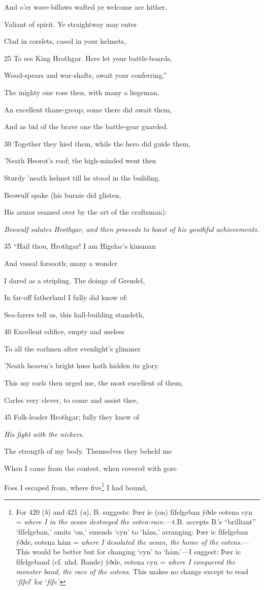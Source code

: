 And o’er wave-billows wafted ye welcome are hither,

Valiant of spirit. Ye straightway may enter

Clad in corslets, cased in your helmets,

25
To see King Hrothgar. Here let your battle-boards,

Wood-spears and war-shafts, await your conferring.”

The mighty one rose then, with many a liegeman,

An excellent thane-group; some there did await them,

And as bid of the brave one the battle-gear guarded.

30
Together they hied them, while the hero did guide them,

’Neath Heorot’s roof; the high-minded went then

Sturdy ’neath helmet till he stood in the building.

Beowulf spake (his burnie did glisten,

His armor seamed over by the art of the craftsman):

\emph{Beowulf salutes
Hrothgar, and
then proceeds to
boast of his youthful
achievements.}

35
“Hail thou, Hrothgar! I am Higelac’s kinsman

And vassal forsooth; many a wonder

I dared as a stripling. The doings of Grendel,

In far-off fatherland I fully did know of:

Sea-farers tell us, this hall-building standeth,

40
Excellent edifice, empty and useless

To all the earlmen after evenlight’s glimmer

’Neath heaven’s bright hues hath hidden its glory.

This my earls then urged me, the most excellent of them,

Carles very clever, to come and assist thee,

45
Folk-leader Hrothgar; fully they knew of

\emph{His fight with the
nickers.}

The strength of my body. Themselves they beheld me

When I came from the contest, when covered with gore

Foes I escaped from, where five\footnote{For 420 (\emph{b}) and 421 (\emph{a}), B. suggests: Þær ic (on) fífelgeban ýðde
eotena cyn = \emph{where I in the ocean destroyed the eoten-race}.—t.B. accepts B.’s
“brilliant” ‘fífelgeban,’ omits ‘on,’ emends ‘cyn’ to ‘hám,’ arranging: Þær ic
fífelgeban ýðde, eotena hám = \emph{where I desolated the ocean, the home of the
eotens}.—This would be better but for changing ‘cyn’ to ‘hám.’—I suggest:
Þær ic fífelgeband (cf. nhd. Bande) ýðde, eotena cyn = \emph{where I conquered the
monster band, the race of the eotens}. This makes no change except to read
‘\emph{fífel}’ for ‘\emph{fífe}.’} I had bound,

